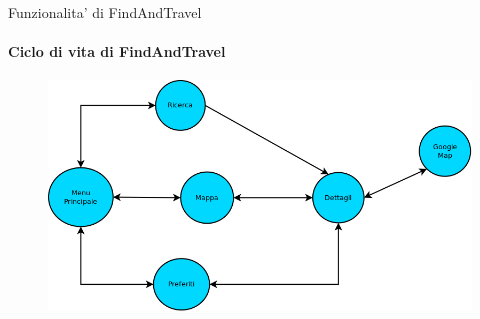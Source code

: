 \documentclass[10pt,a4paper]{beamer}
\begin{document}
\begin{frame}{Funzionalita' di FindAndTravel}
\framesubtitle{Ciclo di vita di FindAndTravel}
  \begin{figure}
   \centering
   \includegraphics[scale=0.2]{CicloDiVitaApp.png}
  \end{figure}
\end{frame}
\end{document}

